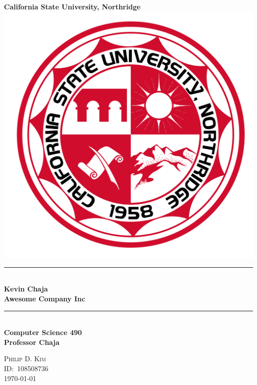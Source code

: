 \begin{titlepage}
  \newcommand{\HRule}{\rule{\linewidth}{0.5mm}}
  \center\Huge\textbf{California State University, Northridge}\\[2cm]
  \includegraphics[scale=0.2]{CSUNS.svg.png}\\[1cm]
  \HRule\  \\[0.4cm]
  {\huge\bfseries Kevin Chaja\\Awesome Company Inc\,\footnotesize\circledR}\\[0.4cm]
  \HRule\  \\[1.4cm]
  \Large\textbf{Computer Science 490}\\[0.5cm]
  \large\textbf{Professor Chaja}
  \vfill
  \begin{minipage}{0.4\textwidth}
  \large\centering\textsc{Philip D. Kim}\\
  \textsc{ID:\ 108508736}\\
  \textsc{\today}
  \end{minipage}
\end{titlepage}